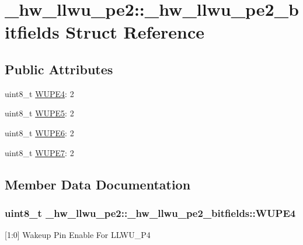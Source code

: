 \hypertarget{struct__hw__llwu__pe2_1_1__hw__llwu__pe2__bitfields}{}\section{\+\_\+hw\+\_\+llwu\+\_\+pe2\+:\+:\+\_\+hw\+\_\+llwu\+\_\+pe2\+\_\+bitfields Struct Reference}
\label{struct__hw__llwu__pe2_1_1__hw__llwu__pe2__bitfields}
\subsection*{Public Attributes}
\begin{DoxyCompactItemize}
\item 
uint8\+\_\+t \hyperlink{struct__hw__llwu__pe2_1_1__hw__llwu__pe2__bitfields_a64d7b7aa108854c2ba6eb5cd9d1ad392}{W\+U\+P\+E4}\+: 2
\item 
uint8\+\_\+t \hyperlink{struct__hw__llwu__pe2_1_1__hw__llwu__pe2__bitfields_a956f50db922f189891bd03057e07fb66}{W\+U\+P\+E5}\+: 2
\item 
uint8\+\_\+t \hyperlink{struct__hw__llwu__pe2_1_1__hw__llwu__pe2__bitfields_a9bc4fa718569c0296c4655166e0a21d8}{W\+U\+P\+E6}\+: 2
\item 
uint8\+\_\+t \hyperlink{struct__hw__llwu__pe2_1_1__hw__llwu__pe2__bitfields_a130e2de1f0ce3c3dd2dc34b101518b85}{W\+U\+P\+E7}\+: 2
\end{DoxyCompactItemize}


\subsection{Member Data Documentation}
\subsubsection[{\texorpdfstring{W\+U\+P\+E4}{WUPE4}}]{\setlength{\rightskip}{0pt plus 5cm}uint8\+\_\+t \+\_\+hw\+\_\+llwu\+\_\+pe2\+::\+\_\+hw\+\_\+llwu\+\_\+pe2\+\_\+bitfields\+::\+W\+U\+P\+E4}\hypertarget{struct__hw__llwu__pe2_1_1__hw__llwu__pe2__bitfields_a64d7b7aa108854c2ba6eb5cd9d1ad392}{}\label{struct__hw__llwu__pe2_1_1__hw__llwu__pe2__bitfields_a64d7b7aa108854c2ba6eb5cd9d1ad392}
\mbox{[}1\+:0\mbox{]} Wakeup Pin Enable For L\+L\+W\+U\+\_\+\+P4 
